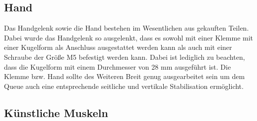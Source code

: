 		\subsection{Hand}
		Das Handgelenk sowie die Hand bestehen im Wesentlichen aus gekauften Teilen.
		Dabei wurde das Handgelenk so ausgelenkt, dass es sowohl mit einer Klemme mit einer Kugelform als Anschluss ausgestattet werden kann als auch mit einer Schraube der Größe M5 befestigt werden kann.
		Dabei ist lediglich zu beachten, dass die Kugelform mit einem Durchmesser von 28 mm ausgeführt ist.
		Die Klemme bzw. Hand sollte des Weiteren Breit genug ausgearbeitet sein um dem Queue auch eine entsprechende seitliche und vertikale Stabilisation ermöglicht. 
		\subsection{Künstliche Muskeln}